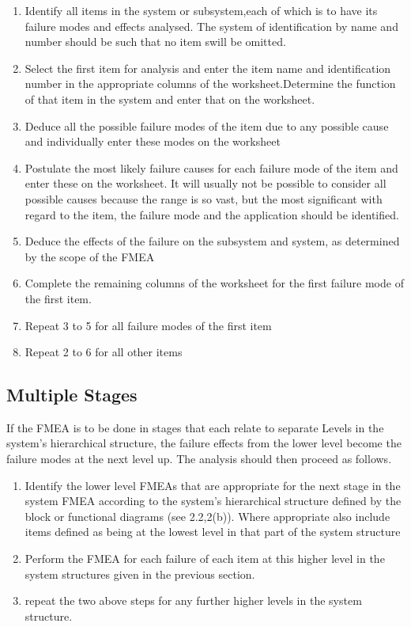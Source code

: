 \documentclass[./dissertation.tex]{subfiles}
\begin{document}
\begin{enumerate}

	\item Identify all items in the system or subsystem,each of which is to have its failure modes and effects analysed. The system of identification by name and number should be such that no item swill be omitted.
	\item Select the first item for analysis and enter the item name and identification number in the appropriate columns of the worksheet.Determine the function of that item in the system and enter that on the worksheet.
	\item Deduce all the possible failure modes of the item due to any possible cause and individually enter these modes on the worksheet
	\item  Postulate the most likely failure causes for each failure mode of the item and enter these on the worksheet. It will usually not be possible to consider all possible causes because the range is so vast, but the most significant with regard to the item, the failure mode and the application should be identified.
	\item Deduce the effects of the failure on the subsystem and system, as determined by the scope of the FMEA
	\item  Complete the remaining columns of the worksheet for the first failure mode of the first item.
	\item Repeat 3 to 5 for all failure modes of the first item
	\item Repeat 2 to 6 for all other items
\end{enumerate}


\subsection{Multiple Stages}
If the FMEA is to be done in stages that each relate to separate Levels in the system's hierarchical structure, the failure effects from the lower level become the failure modes at the next level up. The analysis should then proceed as follows.

\begin{enumerate}
	\item Identify the lower level FMEAs that are appropriate for the next stage in the system FMEA according to the system's hierarchical structure defined by the block or functional diagrams (see 2.2,2(b)). Where appropriate also include items defined as being at the lowest level in that part of the system structure
	\item Perform the FMEA for each failure of each item at this higher level in the system structures given in the previous section.
	\item repeat the two above steps for any further higher levels in the system structure.
\end{enumerate}
\end{document}

